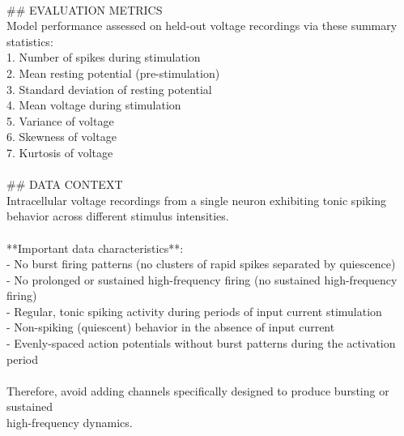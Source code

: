 \begin{tcolorbox}
        \\{}
        \#\# EVALUATION METRICS\\{}
        Model performance assessed on held-out voltage recordings via these summary statistics:\\{}
        1. Number of spikes during stimulation\\{}
        2. Mean resting potential (pre-stimulation)\\{}
        3. Standard deviation of resting potential\\{}
        4. Mean voltage during stimulation\\{}
        5. Variance of voltage\\{}
        6. Skewness of voltage\\{}
        7. Kurtosis of voltage\\{}
        \\{}
        \#\# DATA CONTEXT\\{}
        Intracellular voltage recordings from a single neuron exhibiting tonic spiking\\{}
        behavior across different stimulus intensities.\\{}
        \\{}
        **Important data characteristics**:\\{}
        - No burst firing patterns (no clusters of rapid spikes separated by quiescence)\\{}
        - No prolonged or sustained high-frequency firing (no sustained high-frequency firing)\\{}
        - Regular, tonic spiking activity during periods of input current stimulation\\{}
        - Non-spiking (quiescent) behavior in the absence of input current\\{}
        - Evenly-spaced action potentials without burst patterns during the activation period\\{}
        \\{}
        Therefore, avoid adding channels specifically designed to produce bursting or sustained\\{}
        high-frequency dynamics.
\smallskip
\end{tcolorbox}
\vspace{0.35em}

